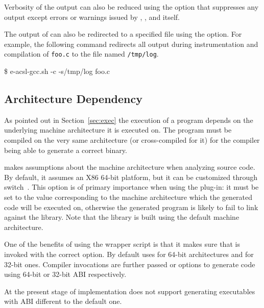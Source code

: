 Verbosity of the \eacslgcc output can also be reduced using the 
option that suppresses any output except errors or warnings issued by \gcc,
\framac, and \eacslgcc itself.

The output of \eacslgcc can also be redirected to a specified file using the
 option.  For example, the following command redirects all
output during instrumentation and compilation of \texttt{foo.c} to the
file named \texttt{/tmp/log}.

\begin{shell}
\$ e-acsl-gcc.sh -c -s/tmp/log foo.c
\end{shell}

\subsection{Architecture Dependency}

As pointed out in Section~\ref{sec:exec} the execution of a \C program depends
on the underlying machine architecture it is executed on. The program must be
compiled on the very same architecture (or cross-compiled for it) for the
compiler being able to generate a correct binary.

\framac makes assumptions about the machine architecture when analyzing source
code.  By default, it assumes an X86 64-bit platform, but it can be customized
through  switch~\cite{userman}. This option is of primary
importance when using the \eacsl plug-in: it must be set to the value
corresponding to the machine architecture which the generated code will be
executed on, otherwise the generated program is likely to fail to link against
the \eacsl library.  Note that the library is built using the default
machine architecture.

One of the benefits of using the wrapper script is that it makes sure that
\framac is invoked with the correct  option. By default
\eacslgcc uses  for 64-bit architectures and
 for 32-bit ones. Compiler invocations are
further passed  or  options to generate code using
64-bit or 32-bit ABI respectively.


At the present stage of implementation \eacsl does not support generating
executables with ABI different to the default one.

